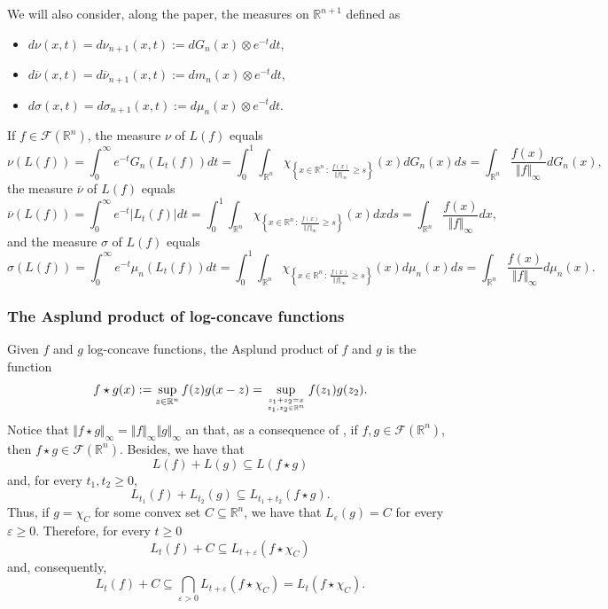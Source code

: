 \documentclass{amsart}
\newcommand{\R}{\mathbb R}
\theoremstyle{remark}
\theoremstyle{definition}
\numberwithin{equation}{section}
\begin{document}
We will also consider, along the paper, the measures on $\R^{n+1}$ defined as
\begin{itemize}
\item $d\nu(x,t)=d\nu_{n+1}(x,t):=dG_n(x)\otimes e^{-t} dt$,
\item $d\overline{\nu}(x,t)=d\overline{\nu}_{n+1}(x,t):=dm_n(x)\otimes e^{-t} dt$,
\item $d\sigma(x,t)=d\sigma_{n+1}(x,t):=d\mu_n(x)\otimes e^{-t}dt$.
\end{itemize}
If $f\in\mathcal{F}(\R^n)$, the measure $\nu$ of $L(f)$ equals
\begin{equation}\label{eq:nu(L)Integral}
\nu(L(f))=\int_0^\infty e^{-t} G_n(L_t(f))dt=\int_0^1\int_{\R^n}\chi_{\left\{x\in\R^n\,:\,\frac{f(x)}{\Vert f\Vert_\infty} \geq s \right\}}(x)dG_n(x)ds=\int_{\R^n}\frac{f(x)}{\Vert f\Vert_\infty}dG_n(x),
\end{equation}
the measure $\overline{\nu}$ of $L(f)$ equals
\begin{equation}\label{eq:barnu(L)Integral}
\overline{\nu}(L(f))=\int_0^\infty e^{-t} |L_t(f)|dt=\int_0^1\int_{\R^n}\chi_{\left\{x\in\R^n\,:\,\frac{f(x)}{\Vert f\Vert_\infty}\geq s\right\}}(x)dxds=\int_{\R^n}\frac{f(x)}{\Vert f\Vert_\infty}dx,
\end{equation}
and the measure $\sigma$ of $L(f)$ equals
\begin{equation}\label{eq:sigma(L)Integral}
\sigma(L(f))=\int_0^\infty e^{-t} \mu_n(L_t(f))dt=\int_0^1\int_{\R^n}\chi_{\left\{x\in\R^n\,:\,\frac{f(x)}{\Vert f\Vert_\infty}\geq s\right\}}(x)d\mu_n(x)ds=\int_{\R^n}\frac{f(x)}{\Vert f\Vert_\infty}d\mu_n(x).
\end{equation}

\subsubsection{The Asplund product of log-concave functions}\label{sec:AsplundProduct}

Given $f$ and $g$ log-concave functions, the Asplund product of $f$ and $g$ is the function
$$
f\star g(x):=\sup_{z\in\R^n}f(z)g(x-z)=\sup_{z_1+z_2=x\atop z_1,z_2\in\R^n}f(z_1)g(z_2).
$$
Notice that $\Vert f\star g\Vert_\infty=\Vert f\Vert_\infty\Vert g\Vert_\infty$ an that, as a consequence of \cite[Thm. 2.1]{AGJV1}, if $f,g\in\mathcal{F}(\R^n)$, then $f\star g\in\mathcal{F}(\R^n)$. Besides, we have that
$$
L(f)+L(g)\subseteq L(f\star g)
$$
and, for every $t_1, t_2\geq0$,
$$
L_{t_1}(f)+L_{t_2}(g)\subseteq L_{t_1+t_2}(f\star g).
$$
Thus, if $g=\chi_C$ for some convex set $C\subseteq\R^n$, we have that $L_{\varepsilon}(g)=C$ for every $\varepsilon\geq0$. Therefore, for every $t\geq0$
$$
L_{t}(f)+C\subseteq L_{t+\varepsilon}(f\star \chi_C)
$$
and, consequently,
\begin{equation}\label{eq:InclusionSuperlevelSetsAsplund}
L_{t}(f)+C\subseteq \bigcap_{\varepsilon>0}L_{t+\varepsilon}(f\star \chi_C)=L_t(f\star\chi_C).
\end{equation}
\end{document}
